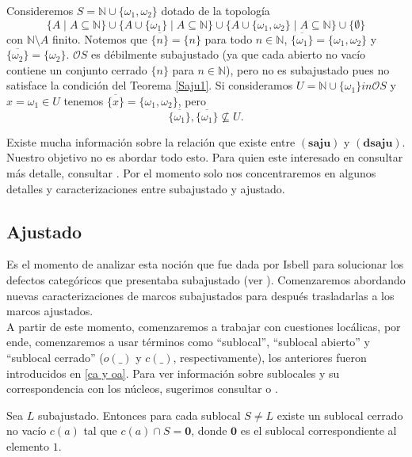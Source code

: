\documentclass{comunicaciones}
\begin{document}
\begin{ej}
    Consideremos $S=\mathbb{N}\cup \{\omega_1, \omega_2\}$ dotado de la topología 
    \[
    \{A\mid A\subseteq \mathbb{N}\}\cup \{A\cup \{\omega_1\}\mid A\subseteq \mathbb{N}\}\cup \{A\cup \{\omega_1,\omega_2\}\mid A\subseteq \mathbb{N}\}\cup \{\emptyset\}
    \]
    con $\mathbb{N}\setminus A$ finito. Notemos que $\overline{\{n\}}=\{n\}$ para todo $n\in \mathbb{N}$, $\overline{\{\omega_1\}}=\{\omega_1, \omega_2\}$ y $\overline{\{\omega_2\}}=\{\omega_2\}$. $\mathcal{O}S$ es débilmente subajustado (ya que cada abierto no vacío contiene un conjunto cerrado $\{n\}$ para $n\in \mathbb{N}$), pero no es subajustado pues no satisface la condición del Teorema \ref{Saju1}. Si consideramos $U=\mathbb{N}\cup \{\omega_1\}in \mathcal{O}S$ y $x=\omega_1\in U$ tenemos $\overline{\{x\}}=\{\omega_1,\omega_2\}$, pero 
    \[
    \overline{\{\omega_1\}}, \overline{\{\omega_1\}}\nsubseteq U.
    \]
\end{ej}

Existe mucha información sobre la relación que existe entre $(\mathbf{saju})$ y $(\mathbf{dsaju})$. Nuestro objetivo no es abordar todo esto. Para quien este interesado en consultar más detalle, consultar \cite{J.P.2}. Por el momento solo nos concentraremos en algunos detalles y caracterizaciones entre subajustado y ajustado.

\subsection{Ajustado}

Es el momento de analizar esta noción que fue dada por Isbell para solucionar los defectos categóricos que presentaba subajustado (ver \cite{Ib.}). Comenzaremos abordando nuevas caracterizaciones de marcos subajustados para después trasladarlas a los marcos ajustados.\\

A partir de este momento, comenzaremos a trabajar con cuestiones locálicas, por ende, comenzaremos a usar términos como ``sublocal'', ``sublocal abierto'' y ``sublocal cerrado'' ($o(\_)$ y $c(\_)$, respectivamente), los anteriores fueron introducidos en \ref{ca y oa}. Para ver información sobre sublocales y su correspondencia con los núcleos, sugerimos consultar \cite{J.M.} o \cite{A.Z.}.  

\begin{prop}\label{Cerradosaju}
    Sea $L$ subajustado. Entonces para cada sublocal $S\neq L$ existe un sublocal cerrado no vacío $c(a)$ tal que $c(a)\cap S=\mathbf{0}$, donde $\mathbf{0}$ es el sublocal correspondiente al elemento $1$.
\end{prop}
\end{document}
